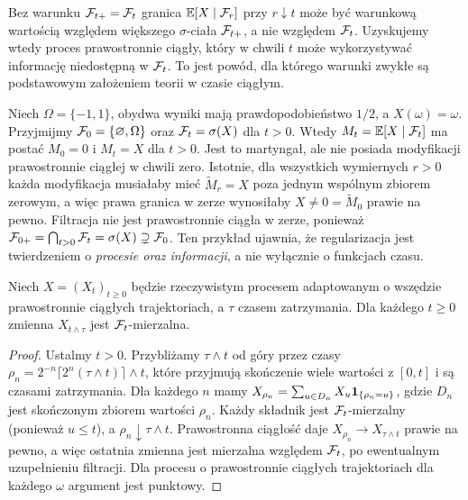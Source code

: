 \begin{uwaga}
Bez warunku $\mathcal{F}_{t+}=\mathcal{F}_t$ granica
$\mathbb{E}[X\mid\mathcal{F}_r]$ przy $r\downarrow t$ może być
warunkową wartością względem większego $\sigma$-ciała
$\mathcal{F}_{t+}$, a nie względem $\mathcal{F}_t$.
Uzyskujemy wtedy proces prawostronnie ciągły, który w chwili
$t$ może wykorzystywać informację niedostępną w $\mathcal{F}_t$.
To jest powód, dla którego warunki zwykłe są podstawowym
założeniem teorii w czasie ciągłym.
\end{uwaga}


\begin{przyklad}
Niech $\Omega=\{-1,1\}$, obydwa wyniki mają prawdopodobieństwo
$1/2$, a $X(\omega)=\omega$. Przyjmijmy $\mathcal{F}_0=\{\varnothing,\Omega\}$
oraz $\mathcal{F}_t=\sigma(X)$ dla $t>0$. Wtedy
$M_t=\mathbb{E}[X\mid\mathcal{F}_t]$ ma postać $M_0=0$ i $M_t=X$ dla $t>0$.
Jest to martyngał, ale nie posiada modyfikacji prawostronnie ciągłej
w chwili zero. Istotnie, dla wszystkich wymiernych $r>0$
każda modyfikacja musiałaby mieć $\widetilde M_r=X$ poza jednym
wspólnym zbiorem zerowym, a więc prawa granica w zerze wynosiłaby
$X\ne0=\widetilde M_0$ prawie na pewno. Filtracja nie jest
prawostronnie ciągła w zerze, ponieważ
$\mathcal{F}_{0+}=\bigcap_{t>0}\mathcal{F}_t=\sigma(X)\supsetneq\mathcal{F}_0$.
Ten przykład ujawnia, że regularizacja jest twierdzeniem o
\emph{procesie oraz informacji}, a nie wyłącznie o funkcjach czasu.
\end{przyklad}

\begin{lemat}
Niech $X=(X_t)_{t\ge0}$ będzie rzeczywistym procesem adaptowanym
o wszędzie prawostronnie ciągłych trajektoriach, a $\tau$ czasem zatrzymania.
Dla każdego $t\ge0$ zmienna $X_{t\wedge\tau}$ jest $\mathcal{F}_t$-mierzalna.
\end{lemat}
\begin{proof}
Ustalmy $t>0$. Przybliżamy $\tau\wedge t$ od góry przez czasy
$\rho_n=2^{-n}\lceil2^n(\tau\wedge t)\rceil\wedge t$, które
przyjmują skończenie wiele wartości z $[0,t]$ i są czasami
zatrzymania. Dla każdego $n$ mamy
$X_{\rho_n}=\sum_{u\in D_n}X_u\mathbf{1}_{\{\rho_n=u\}}$,
gdzie $D_n$ jest skończonym zbiorem wartości $\rho_n$.
Każdy składnik jest $\mathcal{F}_t$-mierzalny (ponieważ $u\le t$),
a $\rho_n\downarrow\tau\wedge t$. Prawostronna ciągłość daje
$X_{\rho_n}\to X_{\tau\wedge t}$ prawie na pewno, a więc ostatnia
zmienna jest mierzalna względem $\mathcal{F}_t$, po ewentualnym
uzupełnieniu filtracji. Dla procesu o prawostronnie ciągłych
trajektoriach dla każdego $\omega$ argument jest punktowy.
\end{proof}



